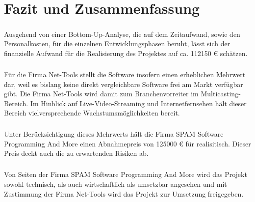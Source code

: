 \chapter{Fazit und Zusammenfassung}
\paragraph{}Ausgehend von einer Bottom-Up-Analyse, die auf dem Zeitaufwand,
sowie den Personalkosten, für die einzelnen Entwicklungsphasen beruht, lässt sich der
finanzielle Aufwand für die Realisierung des Projektes auf ca. 112150 €
schätzen. \paragraph{}Für die Firma Net-Tools stellt die Software insofern einen
erheblichen Mehrwert dar, weil es bislang keine direkt vergleichbare Software
frei am Markt verfügbar gibt. Die Firma Net-Tools wird damit zum Branchenvorreiter im
Multicasting-Bereich. Im Hinblick auf Live-Video-Streaming und Internetfernsehen
hält dieser Bereich vielversprechende Wachstumsmöglichkeiten bereit.

\paragraph{}Unter Berücksichtigung dieses Mehrwerts hält die Firma SPAM
Software Programming And More einen Abnahmepreis von 125000 € für realisitisch.
Dieser Preis deckt auch die zu erwartenden Risiken ab.
\paragraph{}Von Seiten der Firma SPAM Software Programming And More wird das
Projekt sowohl technisch, als auch wirtschaftlich als umsetzbar angesehen und mit Zustimmung
der Firma Net-Tools wird das Projekt zur Umsetzung freigegeben.
